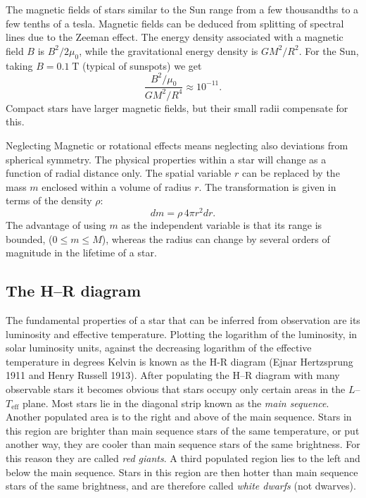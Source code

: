 \documentclass[10pt,amsmath,amssymb,aps,pra]{revtex4-2}
\newcommand{\unit}[1]{\;\mathrm{#1}}
\begin{document}
\begin{description}
The magnetic fields of stars similar to the Sun range from a few thousandths to
a few tenths of a tesla. Magnetic fields can be deduced from splitting of
spectral lines due to the Zeeman effect. The energy density associated with a
magnetic field $B$ is $B^2/2\mu_0$, while the gravitational energy density is
$GM^2/R^2$. For the Sun, taking $B=0.1\unit{T}$ (typical of sunspots) we get
\begin{equation*}
\frac{B^2/\mu_0}{GM^2/R^4}\approx10^{-11}.
\end{equation*}
Compact stars have larger magnetic fields, but their small radii compensate for
this.

Neglecting Magnetic or rotational effects means neglecting also deviations from
spherical symmetry. The physical properties within a star will change as a
function of radial distance only. The spatial variable $r$ can be replaced by
the mass $m$ enclosed within a volume of radius $r$. The transformation is given
in terms of the density $\rho$:
\begin{equation}
dm=\rho\,4\pi{r}^2dr.
\end{equation}
The advantage of using $m$ as the independent variable is that its range is
bounded, ($0\leq{m}\leq{M}$), whereas the radius can change by several orders of
magnitude in the lifetime of a star.

\end{description}

\subsection{The H--R diagram}
The fundamental properties of a star that can be inferred from observation are
its luminosity and effective temperature. Plotting the logarithm of the
luminosity, in solar luminosity units, against the decreasing logarithm of the
effective temperature in degrees Kelvin is known as the H-R diagram (Ejnar
Hertzsprung 1911 and Henry Russell 1913). After populating the H--R diagram with
many observable stars it becomes obvious that stars occupy only certain areas in
the $L$--$T_\text{eff}$ plane. Most stars lie in the diagonal strip known as the
\emph{main sequence}. Another populated area is to the right and above of the
main sequence. Stars in this region are brighter than main sequence stars of the
same temperature, or put another way, they are cooler than main sequence stars
of the same brightness. For this reason they are called \emph{red giants}. A
third populated region lies to the left and below the main sequence. Stars in
this region are then hotter than main sequence stars of the same brightness, and
are therefore called \emph{white dwarfs} (not dwarves).
\end{document}

